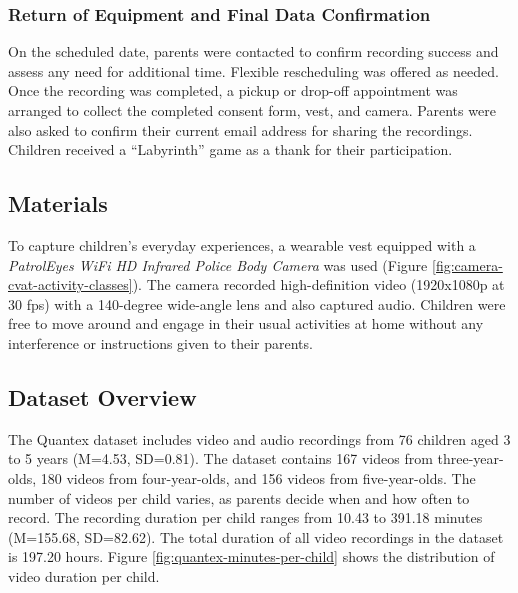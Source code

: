 \documentclass[
  man,floatsintext]{apa6}
\begin{document}
\subsubsection{Return of Equipment and Final Data Confirmation}\label{return-of-equipment-and-final-data-confirmation}

On the scheduled date, parents were contacted to confirm recording success and assess any need for additional time. Flexible rescheduling was offered as needed. Once the recording was completed, a pickup or drop-off appointment was arranged to collect the completed consent form, vest, and camera. Parents were also asked to confirm their current email address for sharing the recordings. Children received a ``Labyrinth'' game as a thank for their participation.

\subsection{Materials}\label{materials}

To capture children's everyday experiences, a wearable vest equipped with a \emph{PatrolEyes WiFi HD Infrared Police Body Camera} was used (Figure \ref{fig:camera-cvat-activity-classes}). The camera recorded high-definition video (1920x1080p at 30 fps) with a 140-degree wide-angle lens and also captured audio. Children were free to move around and engage in their usual activities at home without any interference or instructions given to their parents.

\subsection{Dataset Overview}\label{dataset}

The Quantex dataset includes video and audio recordings from 76 children aged 3 to 5 years (M=4.53, SD=0.81). The dataset contains 167 videos from three-year-olds, 180 videos from four-year-olds, and 156 videos from five-year-olds. The number of videos per child varies, as parents decide when and how often to record. The recording duration per child ranges from 10.43 to 391.18 minutes (M=155.68, SD=82.62). The total duration of all video recordings in the dataset is 197.20 hours. Figure \ref{fig:quantex-minutes-per-child} shows the distribution of video duration per child.
\end{document}

